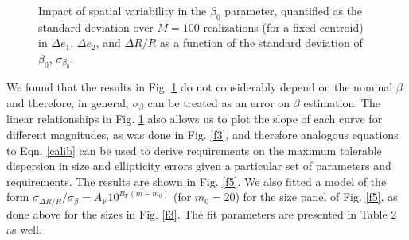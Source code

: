 \documentclass[11pt,preprint,flushrt]{aastex}
\begin{document}
\begin{figure}[!h]
\centering
{}
\caption{Impact of spatial variability in the $\beta_0$ parameter, quantified as the standard deviation over $M=100$ realizations (for a fixed centroid) in $\Delta e_1$,  $\Delta e_2$, and $\Delta R/R$  as a function of the standard deviation of $\beta_0$, $ \sigma_{\beta_0}$. }
\label{f4}
\end{figure}
We found that the results in Fig. \ref{f4} do not considerably depend on the nominal $\beta$ and therefore, in general, $\sigma_{\beta}$  can be treated as an error on $\beta$ estimation. The linear relationships in Fig. \ref{f4} also allows us to plot the slope of each curve for different magnitudes, as was done in Fig. \ref{f3}, and therefore analogous equations to Eqn. \ref{calib} can be used to derive requirements on the maximum tolerable dispersion in size and ellipticity errors given a particular set of parameters and requirements. The results are shown in Fig. \ref{f5}. We also fitted a model of the form $\sigma_{\Delta R/ R}/ \sigma_{\beta} = A_{\text{F}}10^{B_{\text{F}} (m - m_{0})}$ (for $m_0 =20$) for the size panel of Fig. \ref{f5}, as done above for the sizes in Fig. \ref{f3}. The fit parameters are presented in Table 2 as well.  
\end{document}
